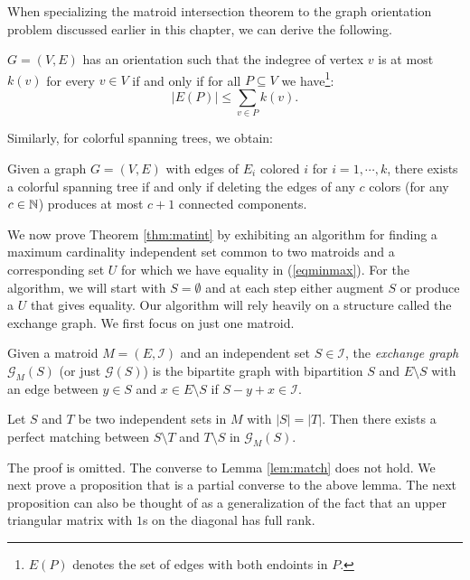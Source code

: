 \documentclass[12pt]{article}
\begin{document}

When specializing the matroid intersection theorem to  the
graph orientation problem discussed earlier in this chapter, we can
derive the following. 
\begin{theorem}
$G=(V,E)$ has an orientation such that the indegree of vertex $v$ is
at most $k(v)$ for every $v\in V$ if and only if for all $P\subseteq
V$ we have\footnote{$E(P)$ denotes the set of edges with both endoints
  in $P$.}:
$$|E(P)|\leq \sum_{v\in P} k(v).$$
\end{theorem}

Similarly, for colorful spanning trees, we obtain:
\begin{theorem}
Given a graph $G=(V,E)$ with edges of $E_i$ colored $i$ for
$i=1,\cdots, k$, there exists a colorful spanning tree if and only if
deleting the edges of any $c$ colors (for any $c\in {\mathbb N}$) produces at
most $c+1$ connected components. 
\end{theorem}

We now prove Theorem \ref{thm:matint} by exhibiting  an algorithm
for finding a maximum cardinality independent set common to two
matroids and a corresponding set $U$ for which we have equality in
(\ref{eqminmax}).  For
the algorithm, we will start with $S = \emptyset$ and at each step
either augment $S$ or produce a $U$ that gives equality. Our algorithm
will rely heavily on a structure called the exchange graph. We first
focus on just one matroid. 

\begin{definition} Given a matroid $M = (E,\mathcal{I})$ and an
independent set $S \in \mathcal{I}$, the \emph{exchange graph}
$\mathcal{G}_M(S)$ (or just $\mathcal{G}(S)$) is the bipartite graph
with bipartition $S$ and $E \setminus S$ with an edge between $y \in
S$ and $x \in E\setminus S$ if $S-y+x \in \mathcal{I}$.
\end{definition}

\begin{lemma} \label{lem:match} Let $S$ and $T$ be two independent
sets in $M$ with $|S| = |T|$. Then there exists a perfect matching
between $S \setminus T$ and $T \setminus S$ in $\mathcal{G}_M(S)$.
\end{lemma}



The proof is omitted. The converse to Lemma \ref{lem:match} does not
hold. We next prove a proposition that is a partial converse to the
above lemma. The next proposition can also be thought of as a generalization of the fact that an upper triangular matrix with $1$s on the diagonal has full rank.
\end{document}
